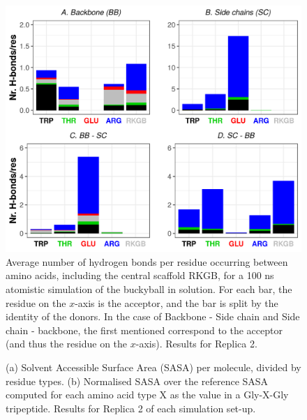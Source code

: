 \begin{figure}[t]
\centering
\includegraphics[width=0.85\linewidth]{3results_capsule/pics/R2_Hb_all.png} 
\caption[(SI) Replica 2: Hydrogen bonds in the buckyball molecule]{Average number of hydrogen bonds per residue occurring between amino acids, including the central scaffold RKGB, for a 100 ns atomistic simulation of the buckyball in solution. For each bar, the residue on the $x$-axis is the acceptor, and the bar is split by the identity of the donors. In the case of Backbone - Side chain and Side chain - backbone, the first mentioned correspond to the acceptor (and thus the residue on the $x$-axis). Results for Replica 2.}
\label{fig:BTI_hbonds2}
\end{figure}

\begin{figure}[t]
\centering
{} 
\caption[(SI) Replica 2: SASA per residue of a buckyball in solution]{(a) Solvent Accessible Surface Area (SASA) per molecule, divided by residue types. (b) Normalised SASA over the reference SASA computed for each amino acid type X as the value in a Gly-X-Gly tripeptide. Results for Replica 2 of each simulation set-up.}
\label{fig:BTI_sasa_exposed2}
\end{figure}

